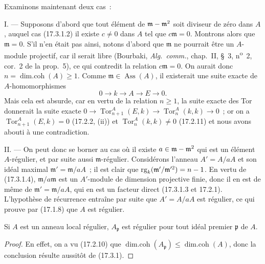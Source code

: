 Examinons maintenant deux cas~:

\medskip\noindent I. --- Supposons d'abord que tout élément de
$\mathfrak{m}-\mathfrak{m}^2$ soit diviseur de zéro dans $A$, auquel cas
(17.3.1.2) il existe $c\neq0$ dans $A$ tel que $c\mathfrak{m}=0$. Montrons
alors que $\mathfrak{m}=0$. S'il n'en était pas ainsi, notons d'abord que
$\mathfrak{m}$ ne pourrait être un $A$-module projectif, car il serait libre
(Bourbaki, \emph{Alg.~comm.}, chap.~II, \S~3, n\textsuperscript{o}~2, cor.~2 de la prop.~5),
ce qui contredit la relation $c\mathfrak{m}=0$. On aurait donc
$n=\operatorname{dim.coh}(A)\geq1$. Comme
$\mathfrak{m}\in\operatorname{Ass}(A)$, il existerait une suite exacte de
$A$-homomorphismes
\[
  0\longrightarrow k\longrightarrow A\longrightarrow E\longrightarrow0.
\]
Mais cela est absurde, car en vertu de la relation $n\geq1$, la suite exacte
des Tor donnerait la suite exacte
$0\longrightarrow\operatorname{Tor}^A_{n+1}(E,k)\longrightarrow
\operatorname{Tor}^A_n(k,k)\longrightarrow0$~; or on a
$\operatorname{Tor}^A_{n+1}(E,k)=0$ (17.2.2, (ii)) et
$\operatorname{Tor}^A_n(k,k)\neq0$ (17.2.11) et nous avons abouti à une
contradiction.

\medskip\noindent II. --- On peut donc se borner au cas où il existe
$a\in\mathfrak{m}-\mathfrak{m}^2$ qui est un élément $A$-régulier, et par
suite aussi $\mathfrak{m}$-régulier. Considérons l'anneau $A'=A/aA$ et son
idéal
maximal $\mathfrak{m}'=\mathfrak{m}/aA$~; il est clair que
$\operatorname{rg}_k(\mathfrak{m}'/\mathfrak{m}'^2)=n- 1$. En vertu de
(17.3.1.4), $\mathfrak{m}/a\mathfrak{m}$ est un $A'$-module de dimension
projective finie, donc il en est de même de
$\mathfrak{m}'=\mathfrak{m}/aA$, qui en est un facteur direct (17.3.1.3 et
17.2.1). L'hypothèse de récurrence entraîne par suite que $A'=A/aA$ est
régulier, ce qui prouve par (17.1.8) que $A$ est régulier.

\begin{corollary}[17.3.2]
\label{0.17.3.2-fr}
Si $A$ est un anneau local régulier, $A_{\mathfrak{p}}$ est régulier pour tout
idéal premier $\mathfrak{p}$ de $A$.
\end{corollary}

\begin{proof}
En effet, on a vu (17.2.10) que
$\operatorname{dim.coh}(A_{\mathfrak{p}})\leq
\operatorname{dim.coh}(A)$, donc la conclusion résulte aussitôt de (17.3.1).
\end{proof}

